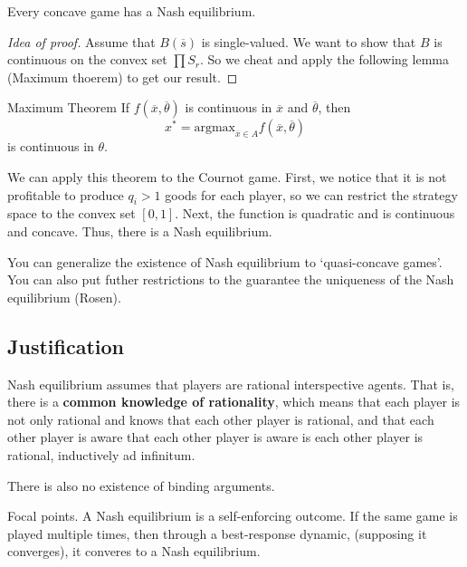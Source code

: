 \begin{atheorem}{}{}
    Every concave game has a Nash equilibrium.
\end{atheorem}
\begin{proof}[Idea of proof]
    Assume that $B(\overline{s})$ is single-valued. We want to show that $B$ is continuous on the convex set $\prod S_r$.
    So we cheat and apply the following lemma (Maximum thoerem) to get our result.
\end{proof}
\begin{alemma}{Maximum Theorem}{}
    If $f(\overline{x},\overline{\theta})$ is continuous in $\overline{x} $ and $\overline{\theta}$, then \[
    x^* = \textrm{argmax}_{\overline{x}\in A} f(\overline{x},\overline{\theta})
    \]
    is continuous in $\theta$.
\end{alemma}
We can apply this theorem to the Cournot game. First, we notice that it is not profitable to produce $q_i>1$ goods for each player, so we can restrict the strategy space to the convex set $[0,1]$. Next, the function is quadratic and is continuous and concave. Thus, there is a Nash equilibrium.
\begin{remark}
    You can generalize the existence of Nash equilibrium to `quasi-concave games'. You can also put futher restrictions to the guarantee the uniqueness of the Nash equilibrium (Rosen).
\end{remark}


\subsection*{Justification}
Nash equilibrium assumes that players are rational interspective agents. That is, there is a \textbf{common knowledge of rationality}, which means that each player is not only rational and knows that each other player is rational, and that each other player is aware that each other player is aware is each other player is rational, inductively ad infinitum.

There is also no existence of binding arguments. 

Focal points. A Nash equilibrium is a self-enforcing outcome. If the same game is played multiple times, then through a best-response dynamic, (supposing it converges), it converes to a Nash equilibrium.
